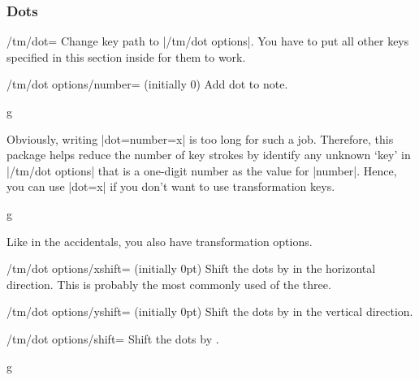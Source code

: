 \subsubsection{Dots}\label{sec:music-notes:misc:dots}
\begin{key}{/tm/dot=}
  Change key path to |/tm/dot options|. You have to put all other keys specified 
  in this section inside  for them to work.
\end{key}
\begin{key}{/tm/dot options/number= (initially 0)}
  Add  dot to note.
\end{key}
\begin{codeexample}[]
\begin{tmline}%
\begin{tmstaff}{g}{}
\end{tmstaff}%
\end{tmline}
\end{codeexample}
Obviously, writing |dot={number=x}| is too long for such a job. Therefore, this 
package helps reduce the number of key strokes by identify any unknown `key' 
in |/tm/dot options| that is a one-digit number as the value for |number|. Hence, 
you can use |dot=x| if you don't want to use transformation keys.
\begin{codeexample}[]
\begin{tmline}%
\begin{tmstaff}{g}{}
\end{tmstaff}%
\end{tmline}
\end{codeexample}
Like in the accidentals, you also have transformation options.
\begin{key}{/tm/dot options/xshift= (initially 0pt)}
  Shift the dots by  in the horizontal direction. This is probably 
  the most commonly used of the three.
\end{key}
\begin{key}{/tm/dot options/yshift= (initially 0pt)}
  Shift the dots by  in the vertical direction.
\end{key}
\begin{key}{/tm/dot options/shift=}
  Shift the dots by .
\end{key}
\begin{codeexample}[]
\begin{tmline}
\begin{tmstaff}{g}{}
\end{tmstaff}
\end{tmline}
\end{codeexample}
